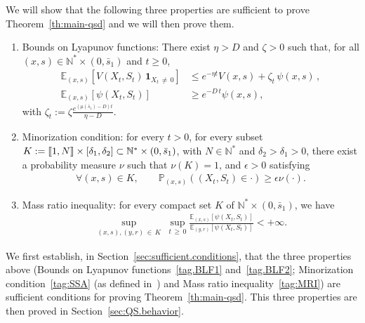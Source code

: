 \documentclass[AHL,Unicode,longabstracts,published]{cedram}
\newcommand{\llbracket}{\mathopen{[\mkern -2.7mu[}}
\newcommand{\rrbracket}{\mathclose{]\mkern -2.7mu]}}
\newcommand{\PP}{\mathbb{P}}
\newcommand{\NN}{\mathbb{N}}
\newcommand{\EE}{\mathbb{E}}
\newcommand{\X}{\NN^* \times (0,\bar s_1)}
\newcommand{\barmu}{\mu(\bar s_1)}
\newcommand{\1}{\mathbf{1}}
\let\oldforall\forall
\renewcommand*{\forall}{\mathrel{\oldforall}}
\begin{document}
We will show that the following three properties are sufficient to prove Theorem~\ref{th:main-qsd} and we will then prove them.
\begin{enumerate}
\item\label{hyp:thm-gen-lyap}
Bounds on Lyapunov functions: There exist $\eta>D$ and $\zeta>0$ such that, for all $(x,s)\in \X$ and $t\geq 0$,
\begin{align}\label{tag.BLF1}
\EE_{(x,s)}\left[V(X_t,S_t) \,\1_{X_t\,\neq\,0}\right] &\leq e^{-\eta t} V(x,s) + \zeta_t \, \psi(x,s)\,,
\tag{BLF1}
\\\label{tag.BLF2}
\EE_{(x,s)}\left[\psi(X_t, S_t) \right] &\geq e^{-D\,t} \psi(x,s),
\tag{BLF2}
\end{align}
with $\zeta_t:=\zeta \frac{e^{(\barmu-D)t}}{\eta-D}$.
\item \label{hyp:thm-gen-smallset}
Minorization condition: for every $t>0$, for every subset $K:=\llbracket 1,N\rrbracket\times [\delta_1,\delta_2]\subset \X$, with $N\in \NN^*$ and $\delta_2>\delta_1>0$, there exist a probability measure $\nu$ such that $\nu(K)=1$, and $\epsilon>0$ satisfying
\begin{align}\label{tag:SSA}
\forall (x,s) \in K, \qquad \PP_{(x,s)}((X_t, S_t) \in \cdot)\geq \epsilon \nu(\cdot).
\tag{MC}
\end{align}

\item \label{hyp:thm-gen-ratio}
Mass ratio inequality: for every compact set $K$ of $\X$, we have
\begin{align}\label{tag:MRI}
\sup_{(x,s),(y,r)\,\in\,K}\; \sup_{t\,\geq\,0} \frac{\EE_{(x,s)}\left[\psi(X_t, S_t) \right] }{\EE_{(y,r)}\left[\psi(X_t, S_t) \right] } < + \infty.
\tag{MRI}
\end{align}
\end{enumerate}


We first establish, in Section~\ref{sec:sufficient.conditions}, that the three properties above (Bounds on Lyapunov functions~\eqref{tag.BLF1} and~\eqref{tag.BLF2}; Minorization condition~\eqref{tag:SSA} (as defined in~\cite{MT12}) and Mass ratio inequality~\eqref{tag:MRI}) are sufficient conditions for proving Theorem~\ref{th:main-qsd}. This three properties are then proved in Section~\ref{sec:QS.behavior}.
\end{document}
